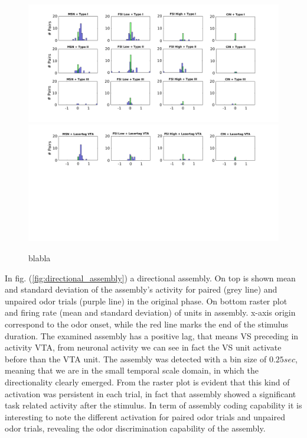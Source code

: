 \begin{figure}[H]
\centering
\includegraphics[scale=0.4]{figures/Type_oriz.png}
\includegraphics[scale=0.4]{figures/OnlyLaserOriz.png}
\caption{blabla}
\label{fig:LagInSecAll}
\end{figure}
In fig. (\ref{fig:directional_assembly}) a directional assembly. On top is shown mean and standard deviation of the assembly's activity for paired (grey line) and unpaired odor trials (purple line) in the original phase. On bottom raster plot and firing rate (mean and standard deviation) of units in assembly. x-axis origin correspond to the odor onset, while the red line marks the end of the stimulus duration. The examined assembly has a positive lag, that means VS preceding in activity VTA, from neuronal activity we can see in fact the VS unit activate before than the VTA unit. The assembly was detected with a bin size of $0.25 sec$, meaning that we are in the small temporal scale domain, in which the directionality clearly emerged. From the raster plot is evident that this kind of activation was persistent in each trial, in fact that assembly showed a significant task related activity after the stimulus. In term of assembly coding capability it is interesting to note the different activation for paired odor trials and unpaired odor trials, revealing the odor discrimination capability of the assembly. 
